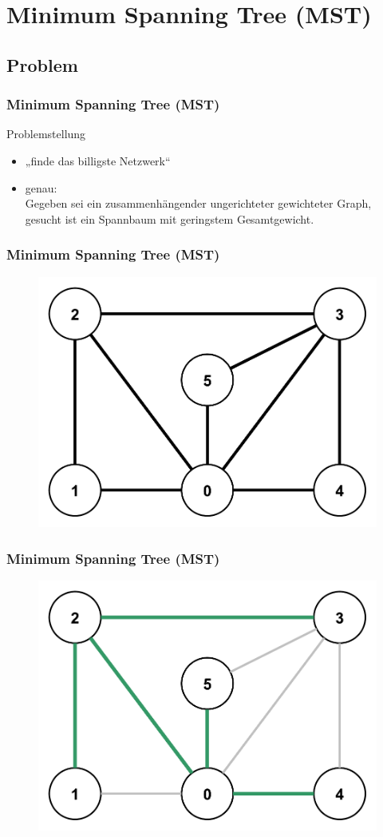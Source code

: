 \section{Minimum Spanning Tree (MST)}

\subsection{Problem}


\begin{frame}
\frametitle{Minimum Spanning Tree (MST)}
\begin{block}{Problemstellung}
\begin{itemize}
\item „finde das billigste Netzwerk“
\item genau: \\
Gegeben sei ein zusammenhängender ungerichteter gewichteter Graph, gesucht ist ein Spannbaum mit geringstem Gesamtgewicht.
\end{itemize}
\end{block}
\end{frame}

\begin{frame}
\frametitle{Minimum Spanning Tree (MST)}
\begin{figure}
\includegraphics[width=0.75\linewidth]{kruskal_graphs/noweights.pdf}
\end{figure}
\end{frame}

\begin{frame}
\frametitle{Minimum Spanning Tree (MST)}
\begin{figure}
\includegraphics[width=0.75\linewidth]{kruskal_graphs/spanningtree1.pdf}
\end{figure}
\end{frame}

